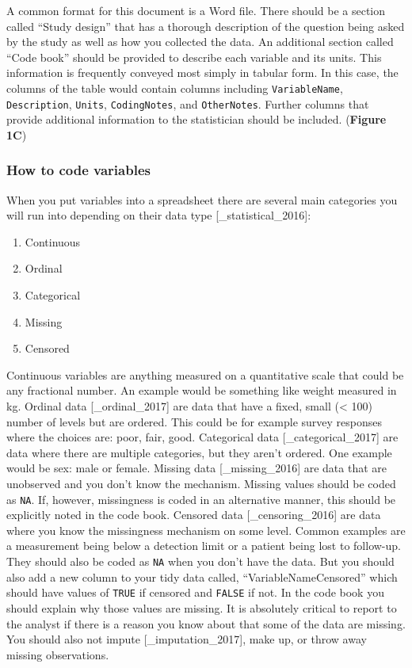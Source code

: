 \documentclass[12pt]{article}
\providecommand{\tightlist}{%
  \setlength{\itemsep}{0pt}\setlength{\parskip}{0pt}}
\begin{document}
A common format for this document is a Word file. There should be a
section called ``Study design'' that has a thorough description of the
question being asked by the study as well as how you collected the data.
An additional section called ``Code book'' should be provided to
describe each variable and its units. This information is frequently
conveyed most simply in tabular form. In this case, the columns of the
table would contain columns including \texttt{VariableName},
\texttt{Description}, \texttt{Units}, \texttt{CodingNotes}, and
\texttt{OtherNotes}. Further columns that provide additional information
to the statistician should be included. (\textbf{Figure 1C})

\subsubsection{How to code variables}
\label{sec:codevar}

When you put variables into a spreadsheet there are several main
categories you will run into depending on their data type
{[}\_statistical\_2016{]}:

\begin{enumerate}
\def\labelenumi{\arabic{enumi}.}
\tightlist
\item
  Continuous
\item
  Ordinal
\item
  Categorical
\item
  Missing
\item
  Censored
\end{enumerate}

Continuous variables are anything measured on a quantitative scale that
could be any fractional number. An example would be something like
weight measured in kg. Ordinal data {[}\_ordinal\_2017{]} are data that
have a fixed, small (\textless{} 100) number of levels but are ordered.
This could be for example survey responses where the choices are: poor,
fair, good. Categorical data {[}\_categorical\_2017{]} are data where
there are multiple categories, but they aren't ordered. One example
would be sex: male or female. Missing data {[}\_missing\_2016{]} are
data that are unobserved and you don't know the mechanism. Missing
values should be coded as \texttt{NA}. If, however, missingness is coded
in an alternative manner, this should be explicitly noted in the code
book. Censored data {[}\_censoring\_2016{]} are data where you know the
missingness mechanism on some level. Common examples are a measurement
being below a detection limit or a patient being lost to follow-up. They
should also be coded as \texttt{NA} when you don't have the data. But
you should also add a new column to your tidy data called,
``VariableNameCensored'' which should have values of \texttt{TRUE} if
censored and \texttt{FALSE} if not. In the code book you should explain
why those values are missing. It is absolutely critical to report to the
analyst if there is a reason you know about that some of the data are
missing. You should also not impute {[}\_imputation\_2017{]}, make up,
or throw away missing observations.
\end{document}
